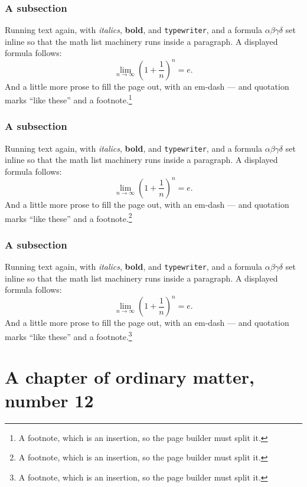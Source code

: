 \documentclass[11pt,a4paper]{report}
\theoremstyle{plain}
\begin{document}
\subsection{A subsection}
Running text again, with \textit{italics}, \textbf{bold}, and
\texttt{typewriter}, and a formula $\alpha\beta\gamma\delta$ set inline so
that the math list machinery runs inside a paragraph. A displayed formula
follows:
\[ \lim_{n\to\infty}\left(1+\frac{1}{n}\right)^{n}=e . \]
And a little more prose to fill the page out, with an em-dash --- and
quotation marks ``like these'' and a footnote.\footnote{A footnote, which is
an insertion, so the page builder must split it.}
\subsection{A subsection}
Running text again, with \textit{italics}, \textbf{bold}, and
\texttt{typewriter}, and a formula $\alpha\beta\gamma\delta$ set inline so
that the math list machinery runs inside a paragraph. A displayed formula
follows:
\[ \lim_{n\to\infty}\left(1+\frac{1}{n}\right)^{n}=e . \]
And a little more prose to fill the page out, with an em-dash --- and
quotation marks ``like these'' and a footnote.\footnote{A footnote, which is
an insertion, so the page builder must split it.}
\subsection{A subsection}
Running text again, with \textit{italics}, \textbf{bold}, and
\texttt{typewriter}, and a formula $\alpha\beta\gamma\delta$ set inline so
that the math list machinery runs inside a paragraph. A displayed formula
follows:
\[ \lim_{n\to\infty}\left(1+\frac{1}{n}\right)^{n}=e . \]
And a little more prose to fill the page out, with an em-dash --- and
quotation marks ``like these'' and a footnote.\footnote{A footnote, which is
an insertion, so the page builder must split it.}
\chapter{A chapter of ordinary matter, number 12}
\end{document}
